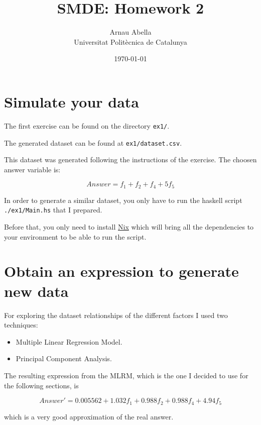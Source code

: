\documentclass[12pt, a4paper]{article} %
\title{%
  SMDE: Homework 2
}
\author{%
  Arnau Abella \\
  \large{Universitat Polit\`ecnica de Catalunya}
}
\date{\today}
\theoremstyle{definition}
\newcommand{\code}[1]{\texttt{#1}} %
\begin{document}
\maketitle


\section{Simulate your data}

The first exercise can be found on the directory \code{ex1/}.

The generated dataset can be found at \code{ex1/dataset.csv}.

This dataset was generated following the instructions of the exercise. The choosen answer variable is:

\begin{equation}
  Answer = f_1 + f_2 + f_4 + 5 f_5
\end{equation}

In order to generate a similar dataset, you only have to run the haskell script \code{./ex1/Main.hs} that I prepared.

Before that, you only need to install \href{https://nixos.org/download.html}{Nix} which will bring all the dependencies to your environment to be able to run the script.


\section{Obtain an expression to generate new data}

For exploring the dataset relationships of the different factors I used two techniques:

\begin{itemize}
  \item Multiple Linear Regression Model.
  \item Principal Component Analysis.
\end{itemize}

\newpage

The resulting expression from the MLRM, which is the one I decided to use for the following sections, is

\begin{equation}
  Answer' = 0.005562 + 1.032f_1 + 0.988f_2 + 0.988f_4 + 4.94f_5
\end{equation}

which is a very good approximation of the real answer.
\end{document}
